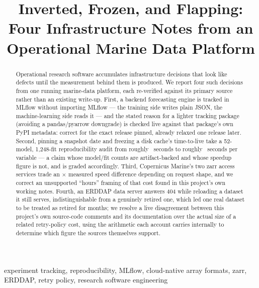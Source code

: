 \documentclass[conference]{IEEEtran}
\begin{document}
\title{Inverted, Frozen, and Flapping: Four Infrastructure Notes from an
Operational Marine Data Platform}

\author{
}

\maketitle

\begin{abstract}
Operational research software accumulates infrastructure decisions that look
like defects until the measurement behind them is produced. We report four
such decisions from one running marine-data platform, each re-verified
against its primary source rather than an existing write-up. First, a
backend forecasting engine is tracked in MLflow without importing MLflow ---
the training side writes plain JSON, the machine-learning side reads it ---
and the stated reason for a lighter tracking package (avoiding a
pandas/pyarrow downgrade) is checked live against that package's own PyPI
metadata: correct for the exact release pinned, already relaxed one release
later. Second, pinning a snapshot date and freezing a disk cache's
time-to-live take a 52-model, 1,248-fit reproducibility audit from roughly
\AuditSecondsUncached{}~seconds to roughly \AuditSecondsCached{}~seconds per
variable --- a claim whose model/fit counts are artifact-backed and whose
speedup figure is not, and is graded accordingly. Third, Copernicus Marine's
two zarr access services trade an \ArcoSlowdownFactor{}$\times$ measured
speed difference depending on request shape, and we correct an unsupported
``hours'' framing of that cost found in this project's own working notes.
Fourth, an ERDDAP data server answers 404 while reloading a dataset it still
serves, indistinguishable from a genuinely retired one, which led one real
dataset to be treated as retired for months; we resolve a live disagreement
between this project's own source-code comments and its documentation over
the actual size of a related retry-policy cost, using the arithmetic each
account carries internally to determine which figure the sources themselves
support.
\end{abstract}

\begin{IEEEkeywords}
experiment tracking, reproducibility, MLflow, cloud-native array formats,
zarr, ERDDAP, retry policy, research software engineering
\end{IEEEkeywords}
\end{document}
